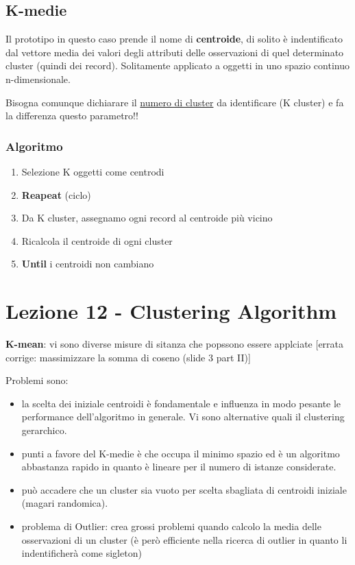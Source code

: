 \subsection{K-medie}
Il prototipo in questo caso prende il nome di \textbf{centroide}, di solito \`e indentificato dal vettore media dei valori degli attributi delle osservazioni di quel determinato cluster (quindi dei record). Solitamente applicato a oggetti in uno spazio continuo n-dimensionale.

Bisogna comunque dichiarare il \underline{numero di cluster} da identificare (K cluster) e fa la differenza questo parametro!! 

\subsubsection{Algoritmo}
\begin{enumerate}
	\item Selezione K oggetti come centrodi
	\item \textbf{Reapeat} (ciclo)
	\item Da K cluster, assegnamo ogni record al centroide pi\`u vicino
	\item Ricalcola il centroide di ogni cluster
	\item \textbf{Until} i centroidi non cambiano
\end{enumerate}

\section{Lezione 12 - Clustering Algorithm}

\textbf{K-mean}: vi sono diverse misure di sitanza che popssono essere applciate [errata corrige: massimizzare la somma di coseno (slide 3 part II)]

Problemi sono:
\begin{itemize}
	\item la scelta dei iniziale centroidi \`e fondamentale e influenza in modo pesante le performance dell'algoritmo in generale. Vi sono alternative quali il clustering gerarchico.
	\item punti a favore del K-medie \`e che occupa il minimo spazio ed \`e un algoritmo abbastanza rapido in quanto \`e lineare per il numero di istanze considerate. 
	\item pu\`o accadere che un cluster sia vuoto per scelta sbagliata di centroidi iniziale (magari randomica).
	\item problema di Outlier: crea grossi problemi quando calcolo la media delle osservazioni di un cluster (\`e per\`o efficiente nella ricerca di outlier in quanto li indentificher\`a come sigleton)
	
\end{itemize}

